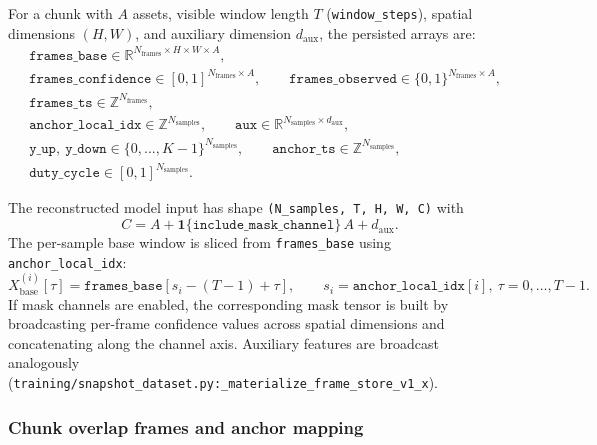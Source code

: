 \documentclass[11pt]{article}
\begin{document}
For a chunk with $A$ assets, visible window length $T$ (\texttt{window\_steps}), spatial dimensions $(H,W)$, and auxiliary dimension $d_{\mathrm{aux}}$, the persisted arrays are:
\begin{align}
  &\texttt{frames\_base} \in \mathbb{R}^{N_{\mathrm{frames}}\times H\times W\times A}, \\
  &\texttt{frames\_confidence} \in [0,1]^{N_{\mathrm{frames}}\times A}, \qquad \texttt{frames\_observed} \in \{0,1\}^{N_{\mathrm{frames}}\times A}, \\
  &\texttt{frames\_ts} \in \mathbb{Z}^{N_{\mathrm{frames}}}, \\
  &\texttt{anchor\_local\_idx} \in \mathbb{Z}^{N_{\mathrm{samples}}}, \qquad \texttt{aux} \in \mathbb{R}^{N_{\mathrm{samples}}\times d_{\mathrm{aux}}}, \\
  &\texttt{y\_up},\ \texttt{y\_down} \in \{0,\ldots,K-1\}^{N_{\mathrm{samples}}}, \qquad \texttt{anchor\_ts} \in \mathbb{Z}^{N_{\mathrm{samples}}}, \\
  &\texttt{duty\_cycle} \in [0,1]^{N_{\mathrm{samples}}}.
\end{align}

The reconstructed model input has shape \texttt{(N\_samples, T, H, W, C)} with
\begin{equation}
  C = A + \mathbf{1}\{\texttt{include\_mask\_channel}\}\,A + d_{\mathrm{aux}}.
\end{equation}
The per-sample base window is sliced from \texttt{frames\_base} using \texttt{anchor\_local\_idx}:
\begin{equation}
  X^{(i)}_{\mathrm{base}}[\tau] = \texttt{frames\_base}[s_i-(T-1)+\tau], \qquad s_i = \texttt{anchor\_local\_idx}[i],\ \tau=0,\ldots,T-1.
\end{equation}
If mask channels are enabled, the corresponding mask tensor is built by broadcasting per-frame confidence values across spatial dimensions and concatenating along the channel axis. Auxiliary features are broadcast analogously (\texttt{training/snapshot\_dataset.py:\_materialize\_frame\_store\_v1\_x}).

\subsubsection{Chunk overlap frames and anchor mapping}
\end{document}
